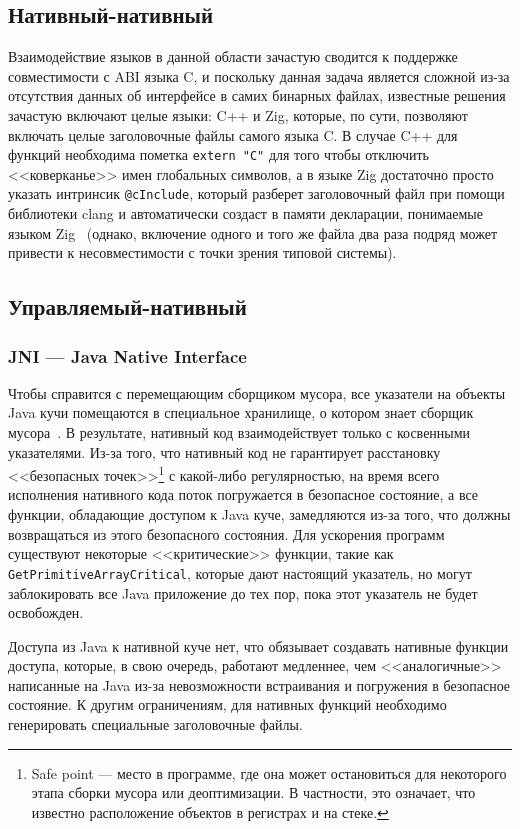 \documentclass[times
]{itmo-student-thesis}
\begin{document}
\subsection{Нативный-нативный}
Взаимодействие языков в данной области зачастую сводится к поддержке совместимости с ABI языка C, и поскольку данная задача является сложной из-за отсутствия данных об интерфейсе в самих бинарных файлах, известные решения зачастую включают целые языки: C++ и Zig, которые, по сути, позволяют включать целые заголовочные файлы самого языка C. В случае C++ для функций необходима пометка \texttt{extern "C"} для того чтобы отключить <<коверканье>> имен глобальных символов, а в языке Zig достаточно просто указать интринсик \texttt{@cInclude}, который разберет заголовочный файл при помощи библиотеки clang и автоматически создаст в памяти декларации, понимаемые языком Zig~\cite{zig-cinclude} (однако, включение одного и того же файла два раза подряд может привести к несовместимости с точки зрения типовой системы).

\subsection{Управляемый-нативный}
\subsubsection{JNI --- Java Native Interface}
Чтобы справится с перемещающим сборщиком мусора, все указатели на объекты Java кучи помещаются в специальное хранилище, о котором знает сборщик мусора~\cite{jni-obj-references}. В результате, нативный код взаимодействует только с косвенными указателями. Из-за того, что нативный код не гарантирует расстановку <<безопасных точек>>\footnote{Safe point --- место в программе, где она может остановиться для некоторого этапа сборки мусора или деоптимизации. В частности, это означает, что известно расположение объектов в регистрах и на стеке.} с какой-либо регулярностью, на время всего исполнения нативного кода поток погружается в безопасное состояние, а все функции, обладающие доступом к Java куче, замедляются из-за того, что должны возвращаться из этого безопасного состояния. Для ускорения программ существуют некоторые <<критические>> функции, такие как \texttt{GetPrimitiveArrayCritical}, которые дают настоящий указатель, но могут заблокировать все Java приложение до тех пор, пока этот указатель не будет освобожден.

Доступа из Java к нативной куче нет, что обязывает создавать нативные функции доступа, которые, в свою очередь, работают медленнее, чем <<аналогичные>> написанные на Java из-за невозможности встраивания и погружения в безопасное состояние. К другим ограничениям, для нативных функций необходимо генерировать специальные заголовочные файлы.
\end{document}
